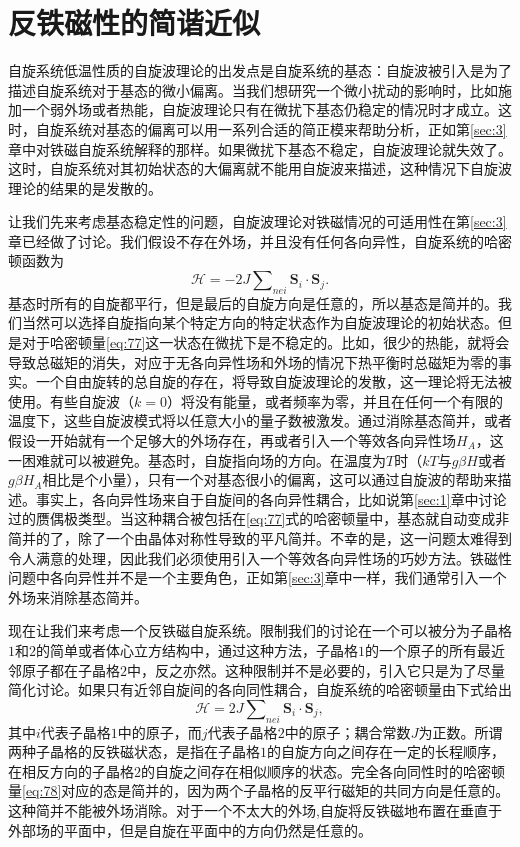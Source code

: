 \documentclass{article}
\begin{document}
\section{反铁磁性的简谐近似} \label{sec:7}

自旋系统低温性质的自旋波理论的出发点是自旋系统的基态：自旋波被引入是为了描述自旋系统对于基态的微小偏离。当我们想研究一个微小扰动的影响时，比如施加一个弱外场或者热能，自旋波理论只有在微扰下基态仍稳定的情况时才成立。这时，自旋系统对基态的偏离可以用一系列合适的简正模来帮助分析，正如第\ref{sec:3}章中对铁磁自旋系统解释的那样。如果微扰下基态不稳定，自旋波理论就失效了。这时，自旋系统对其初始状态的大偏离就不能用自旋波来描述，这种情况下自旋波理论的结果的是发散的。

让我们先来考虑基态稳定性的问题，自旋波理论对铁磁情况的可适用性在第\ref{sec:3}章已经做了讨论。我们假设不存在外场，并且没有任何各向异性，自旋系统的哈密顿函数为
\begin{equation} \label{eq:77}
\mathcal{H}=-2J\sum\nolimits_{\textit{nei}}\mathbf{S}_i\cdot\mathbf{S}_j.
\end{equation} 
基态时所有的自旋都平行，但是最后的自旋方向是任意的，所以基态是简并的。我们当然可以选择自旋指向某个特定方向的特定状态作为自旋波理论的初始状态。但是对于哈密顿量\eqref{eq:77}这一状态在微扰下是不稳定的。比如，很少的热能，就将会导致总磁矩的消失，对应于无各向异性场和外场的情况下热平衡时总磁矩为零的事实。一个自由旋转的总自旋的存在，将导致自旋波理论的发散，这一理论将无法被使用。有些自旋波（$k=0$）将没有能量，或者频率为零，并且在任何一个有限的温度下，这些自旋波模式将以任意大小的量子数被激发。通过消除基态简并，或者假设一开始就有一个足够大的外场存在，再或者引入一个等效各向异性场$H_A$，这一困难就可以被避免。基态时，自旋指向场的方向。在温度为$T$时（$kT$与$g\beta H$或者$g\beta H_A$相比是个小量），只有一个对基态很小的偏离，这可以通过自旋波的帮助来描述。事实上，各向异性场来自于自旋间的各向异性耦合，比如说第\ref{sec:1}章中讨论过的赝偶极类型。当这种耦合被包括在\eqref{eq:77}式的哈密顿量中，基态就自动变成非简并的了，除了一个由晶体对称性导致的平凡简并。不幸的是，这一问题太难得到令人满意的处理，因此我们必须使用引入一个等效各向异性场的巧妙方法。铁磁性问题中各向异性并不是一个主要角色，正如第\ref{sec:3}章中一样，我们通常引入一个外场来消除基态简并。


现在让我们来考虑一个反铁磁自旋系统。限制我们的讨论在一个可以被分为子晶格$1$和$2$的简单或者体心立方结构中，通过这种方法，子晶格$1$的一个原子的所有最近邻原子都在子晶格$2$中，反之亦然。这种限制并不是必要的，引入它只是为了尽量简化讨论。如果只有近邻自旋间的各向同性耦合，自旋系统的哈密顿量由下式给出
\begin{equation} \label{eq:78}
\mathcal{H}=2J\sum\nolimits_{\mathit{nei}}\mathbf{S}_i\cdot\mathbf{S}_j,
\end{equation}
其中$i$代表子晶格$1$中的原子，而$j$代表子晶格$2$中的原子；耦合常数$J$为正数。所谓两种子晶格的反铁磁状态，是指在子晶格$1$的自旋方向之间存在一定的长程顺序，在相反方向的子晶格$2$的自旋之间存在相似顺序的状态。完全各向同性时的哈密顿量\eqref{eq:78}对应的态是简并的，因为两个子晶格的反平行磁矩的共同方向是任意的。这种简并不能被外场消除。对于一个不太大的外场,自旋将反铁磁地布置在垂直于外部场的平面中，但是自旋在平面中的方向仍然是任意的。
\end{document}
